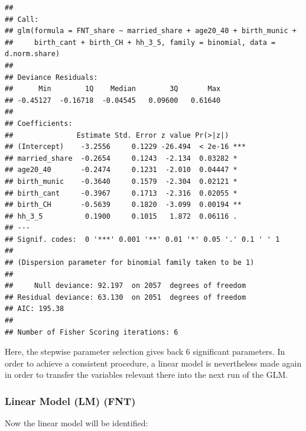 \documentclass[
]{article}
\begin{document}
\begin{verbatim}
## 
## Call:
## glm(formula = FNT_share ~ married_share + age20_40 + birth_munic + 
##     birth_cant + birth_CH + hh_3_5, family = binomial, data = d.norm.share)
## 
## Deviance Residuals: 
##      Min        1Q    Median        3Q       Max  
## -0.45127  -0.16718  -0.04545   0.09600   0.61640  
## 
## Coefficients:
##               Estimate Std. Error z value Pr(>|z|)    
## (Intercept)    -3.2556     0.1229 -26.494  < 2e-16 ***
## married_share  -0.2654     0.1243  -2.134  0.03282 *  
## age20_40       -0.2474     0.1231  -2.010  0.04447 *  
## birth_munic    -0.3640     0.1579  -2.304  0.02121 *  
## birth_cant     -0.3967     0.1713  -2.316  0.02055 *  
## birth_CH       -0.5639     0.1820  -3.099  0.00194 ** 
## hh_3_5          0.1900     0.1015   1.872  0.06116 .  
## ---
## Signif. codes:  0 '***' 0.001 '**' 0.01 '*' 0.05 '.' 0.1 ' ' 1
## 
## (Dispersion parameter for binomial family taken to be 1)
## 
##     Null deviance: 92.197  on 2057  degrees of freedom
## Residual deviance: 63.130  on 2051  degrees of freedom
## AIC: 195.38
## 
## Number of Fisher Scoring iterations: 6
\end{verbatim}

Here, the stepwise parameter selection gives back 6 significant
parameters. In order to achieve a consistent procedure, a linear model
is nevertheless made again in order to transfer the variables relevant
there into the next run of the GLM.

\hypertarget{linear-model-lm-fnt}{%
\subsubsection{Linear Model (LM) (FNT)}\label{linear-model-lm-fnt}}

Now the linear model will be identified:
\end{document}
